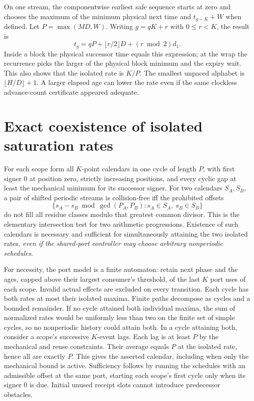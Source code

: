 \documentclass[11pt]{article}
\begin{document}
On one stream, the componentwise earliest safe sequence starts at
zero and chooses the maximum of the minimum physical next time and
\(t_{g-K}+W\) when defined. Let \(P=\max(MD,W)\). Writing \(g=qK+r\)
with \(0\leq r<K\), the result is
\[
       t_g=qP+\lfloor r/2\rfloor D+(r\bmod 2)d_1.
\]
Inside a block the physical successor time equals this expression;
at the wrap the recurrence picks the larger of the physical block
minimum and the expiry wait. This also shows that the isolated rate
is \(K/P\). The smallest unpaced alphabet is \(\lfloor H/D\rfloor+1\).
A larger elapsed age can lower the rate even if the same clockless
advance-count certificate appeared adequate.

\section{Exact coexistence of isolated saturation rates}
For each scope form all \(K\)-point calendars in one cycle of length
\(P\), with first signer 0 at position zero, strictly increasing
positions, and every cyclic gap at least the mechanical minimum for
its successor signer. For two calendars \(S_A,S_B\), a pair of shifted
periodic streams is collision-free iff the prohibited offsets
\[
         \{s_A-s_B\bmod \gcd(P_A,P_B):s_A\in S_A,\ s_B\in S_B\}
\]
do not fill all residue classes modulo that greatest common divisor.
This is the elementary intersection test for two arithmetic
progressions. Existence of such calendars is necessary and sufficient
for simultaneously attaining the two isolated rates, \emph{even if the
shared-port controller may choose arbitrary nonperiodic schedules}.

For necessity, the port model is a finite automaton: retain next
phase and the ages, capped above their largest consumer's threshold,
of the last \(K\) port uses of each scope. Invalid actual
effects are excluded on every transition. Each cycle has both rates
at most their isolated maxima. Finite paths decompose as cycles and a
bounded remainder. If no cycle attained both individual maxima, the
sum of normalized rates would be uniformly less than two on the finite
set of simple cycles, so no nonperiodic history could attain both.
In a cycle attaining both, consider a scope's successive \(K\)-event
lags. Each lag is at least \(P\) by the mechanical and reuse
constraints. Their average equals \(P\) at the isolated rate, hence
all are exactly \(P\). This gives the asserted calendar, including
when only the mechanical bound is active. Sufficiency follows by
running the schedules with an admissible offset at the same port,
starting each scope's first cycle only when its signer 0 is due.
Initial unused receipt slots cannot introduce predecessor obstacles.
\end{document}
